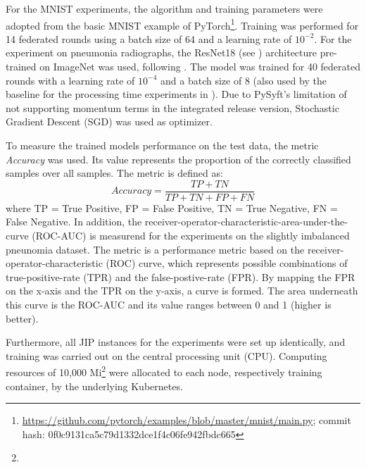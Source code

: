 For the MNIST experiments, the algorithm and training parameters were adopted from the basic MNIST example of PyTorch\footnote{\url{https://github.com/pytorch/examples/blob/master/mnist/main.py}; commit hash: 0f0c9131ca5c79d1332dce1f4c06fe942fbdc665}. Training was performed for 14 federated rounds using a batch size of 64 and a learning rate of $10^{-2}$. For the experiment on pneumonia radiographs, the ResNet18 (see \cite{He2016DeepRecognition}) architecture pre-trained on ImageNet was used, following \cite{Kaissis2021End-to-endImaging}. The model was trained for 40 federated rounds with a learning rate of $10^{-4}$ and a batch size of 8 (also used by the baseline for the processing time experiments in \cite{Kaissis2021End-to-endImaging}). Due to PySyft's limitation of not supporting momentum terms in the integrated release version, Stochastic Gradient Descent (SGD) was used as optimizer.


To measure the trained models performance on the test data, the metric \textit{Accuracy} was used. Its value represents the proportion of the correctly classified samples over all samples. The metric is defined as:
\begin{equation}
Accuracy=\frac{TP + TN}{TP + TN + FP + FN} \label{eq:accuracy}
\end{equation}
where TP = True Positive, FP = False Positive, TN = True Negative, FN = False Negative.
In addition, the receiver-operator-characteristic-area-under-the-curve (ROC-AUC) is measurend for the experiments on the slightly imbalanced pneunomia dataset.
The metric is a performance metric based on the receiver-operator-characteristic (ROC) curve, which represents possible combinations of true-positive-rate (TPR) and the false-postive-rate (FPR).
By mapping the FPR on the x-axis and the TPR on the y-axis, a curve is formed. The area underneath this curve is the ROC-AUC and its value ranges between 0 and 1 (higher is better). 


Furthermore, all JIP instances for the experiments were set up identically, and training was carried out on the central processing unit (CPU). Computing resources of 10,000 Mi\footnote{} were allocated to each node, respectively training container, by the underlying Kubernetes.

